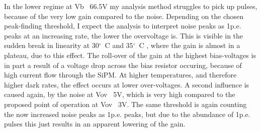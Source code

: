 \documentclass[12pt,article,type=msc,colorback,accentcolor=tud9c]{tudthesis}
\begin{document}
In the lower regime at Vb ~66.5V my analysis method struggles to pick up pulses, because of the very low gain compared to the noise. Depending on the chosen peak-finding threshold, I expect the analysis to interpret noise peaks as 1p.e. peaks at an increasing rate, the lower the overvoltage is. This is visible in the sudden break in linearity at 30$^{\circ}$~C and 35$^{\circ}$~C , where the gain is almost in a plateau, due to this effect. The roll-over of the gain at the highest bias-voltages is in part a result of a voltage drop across the bias resistor occuring, because of high current flow through the SiPM. At higher temperatures, and therefore higher dark rates, the effect occurs at lower over-voltages. A second influence is caused again, by the noise at Vov ~5V, which is very high compared to the proposed point of operation at Vov ~3V. The same threshold is again counting the now increased noise peaks as 1p.e. peaks, but due to the abundance of 1p.e. pulses this just results in an apparent lowering of the gain.




\end{document}
